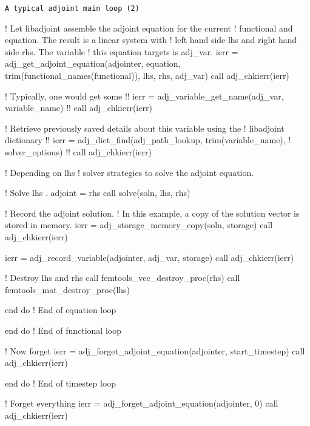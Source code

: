 \begin{boxwithtitle}{\texttt{A typical adjoint main loop (2)}}
\begin{minipage}{\columnwidth}
\begin{fortrancode}   
        ! Let libadjoint assemble the adjoint equation for the current 
        ! functional and equation. The result is a linear system with 
        ! left hand side lhs and right hand side rhs. The variable 
        ! this equation targets is adj_var. 
        ierr = adj_get_adjoint_equation(adjointer, equation, 
                                        trim(functional_names(functional)), 
                                        lhs, rhs, adj_var)
        call adj_chkierr(ierr)

        ! Typically, one would get some 
        !! ierr = adj_variable_get_name(adj_var, variable_name)
        !! call adj_chkierr(ierr)

        ! Retrieve previously saved details about this variable using the 
        ! libadjoint dictionary
        !! ierr = adj_dict_find(adj_path_lookup, trim(variable_name), 
        !                       solver_options)
        !! call adj_chkierr(ierr)

        ! Depending on lhs%
        ! solver strategies to solve the adjoint equation.

        ! Solve lhs . adjoint = rhs 
        call solve(soln, lhs, rhs)

        ! Record the adjoint solution. 
        ! In this example, a copy of the solution vector is stored in memory.
        ierr = adj_storage_memory_copy(soln, storage)
        call adj_chkierr(ierr)

        ierr = adj_record_variable(adjointer, adj_var, storage)
        call adj_chkierr(ierr)

        ! Destroy lhs and rhs
        call femtools_vec_destroy_proc(rhs)
        call femtools_mat_destroy_proc(lhs)

      end do ! End of equation loop
      
    end do ! End of functional loop

    ! Now forget
    ierr = adj_forget_adjoint_equation(adjointer, start_timestep)
    call adj_chkierr(ierr)

  end do ! End of timestep loop

  ! Forget everything
  ierr = adj_forget_adjoint_equation(adjointer, 0)
  call adj_chkierr(ierr)
\end{fortrancode}
\end{minipage}
\end{boxwithtitle}



